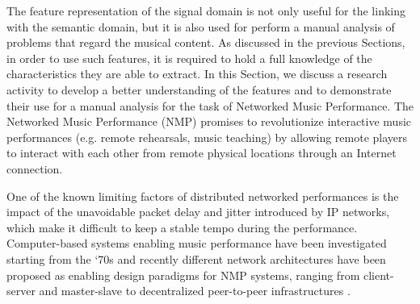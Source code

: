 The feature representation of the signal domain is not only useful for the linking with the semantic domain, but it is also used for perform a manual analysis of problems that regard the musical content. As discussed in the previous Sections, in order to use such features, it is required to hold a full knowledge of the characteristics they are able to extract. In this Section, we discuss a research activity to develop a better understanding of the features and to demonstrate their use for a manual analysis for the task of Networked Music Performance. The Networked Music Performance (NMP) promises to revolutionize interactive music performances (e.g. remote rehearsals, music teaching) by allowing remote players to interact with each other from remote physical locations through an Internet connection. %

%
%

One  of the known limiting factors of distributed networked performances is the impact of the unavoidable packet delay and jitter introduced by IP networks, which make it difficult to keep a stable tempo during the performance. Computer-based systems enabling music performance have been investigated starting from the \lq 70s \cite{barbosa2003displaced} and recently different network architectures have been proposed as enabling design paradigms for NMP systems, ranging from client-server \cite{saputra2012design,gu2005network} and master-slave \cite{renwick2012sourcenode} to decentralized peer-to-peer infrastructures \cite{stais2013networked,chafe2011living}. 

